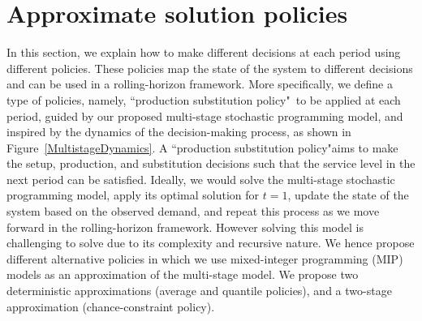 \documentclass[10pt]{article}
\newcommand{\ti}{t} %
\newcommand{\jey}{j} %
\newcommand{\Es}{S} %
\newcommand{\Csub}{\mathcal{K}^+_k}
\newcommand{\Psub}{\mathcal{K}^-_k}
\newcommand{\PSpolicy}{``production substitution policy"}
\newcommand{\cred}{\color{red!65!black}}
\begin{document}
\begin{comment}
{\cred Note: I just keep this red part in case we need to have mathematical proof

In this model, it is not explicit that the recourse stage should be feasible. It is using the convention that if it is infeasible, the value function return infinite cost.}


{\cred * Given stage t and the history, $\xi^t, \exists x^t(\xi^t) \in \chi^t(x^t) \rightarrow v(\xi^t)$\\
$s.t.$ \\
$P_{\xi^{t+1}|\xi^t}\{v^{t}(\xi^t)-\sum_{\jey \in  \Csub}\Es_{kj}(\xi^{t+1})+\sum_{\jey \in  \Psub}\Es_{jk}(\xi^{t+1}) \geq D^{t+1}(\xi^{t+1}) $ for some $\Es_{kj}(\xi^{t+1}) , \Es_{jk}(\xi^{t+1}) \in  \chi ^{t+1}(\xi^{t+1}) \} \geq \alpha$ \\
This can be satisfied for instance if we have at least one uncapacitated product option (whether by its own production or substitution) for each product.

}
\end{comment}


\section{Approximate solution policies}
\label{sec:approx}

In this section, we explain how to make different decisions at each period using different policies. 
These policies map the state of the system to different decisions and can be used in a rolling-horizon framework. 
More specifically, we define a type of policies, namely, \PSpolicy \ to be applied at each period, guided by our proposed multi-stage stochastic programming model, and inspired by the dynamics of the decision-making process, as shown in Figure~\ref{MultistageDynamics}. A \PSpolicy aims to make the setup, production, and substitution decisions such that the service level in the next period can be satisfied.
Ideally, we would solve the multi-stage stochastic programming model, apply its optimal solution for $\ti =1$, update the state of the system based on the observed demand, and repeat this process as we move forward in the rolling-horizon framework. However solving this model is challenging to solve due to its complexity and recursive nature. We hence propose different alternative policies in which we use mixed-integer programming (MIP) models as an approximation of the multi-stage model. We propose two deterministic approximations (average and quantile policies), and a two-stage approximation (chance-constraint policy). 
\end{document}
